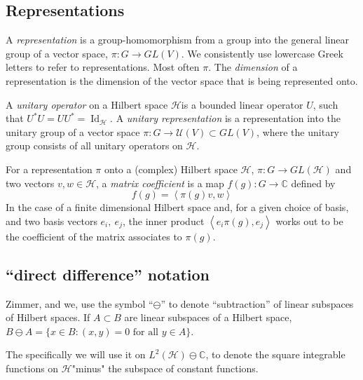 \documentclass[
  12pt
]{article}
\theoremstyle{break}
\theoremstyle{plain}
\newcommand{\bbc}{\ensuremath{\mathbb{C}}}
\newcommand{\hilb}{\ensuremath{\mathscr{H}}}
\newcommand{\inn}[1]{\left\langle #1 \right\rangle}
\DeclareMathOperator{\Id}{Id}
\begin{document}
  \hypertarget{representations}{%
  \subsection{Representations}\label{representations}}


  A \emph{representation} is a group-homomorphism from a group into the general linear
  group of a vector space, $\pi: G \rightarrow GL(V)$.
  We consistently use lowercase Greek letters to refer to representations.
  Most often $\pi$.
  The \emph{dimension} of a representation is the dimension of the vector space
  that is being represented onto.


  A \emph{unitary operator} on a Hilbert space \hilb is a bounded linear
  operator $U$, such that $U^*U= UU^* = \Id_{\hilb}$. A \emph{unitary
  representation} is a representation into the unitary group of a vector space
  $\pi: G \rightarrow \mathcal{U}(V) \subset GL(V)$, where the unitary group
  consists of all unitary operators on \hilb.

  For a representation $\pi$ onto a (complex) Hilbert space \hilb, $\pi:G \rightarrow GL(\hilb)$
  and two vectors $v, w \in \hilb$,
  a \emph{matrix coefficient} is a map $f(g): G \rightarrow \bbc$ defined by
  $$
  f(g) = \inn{\pi(g)v, w}
  $$
  In the case of a finite dimensional Hilbert space and, for a given choice of basis, and two basis vectors $e_i,\ e_j$,
  the inner product $\inn{e_i\pi(g), e_j}$ works out to be the coefficient of the matrix associates to $\pi(g)$.






  \hypertarget{direct-difference-notation}{%
  \subsection{``direct difference''
  notation}\label{direct-difference-notation}}

  Zimmer, and we, use the symbol ``$\ominus$'' to denote ``subtraction''
  of linear subspaces of Hilbert spaces. If $A \subset B$ are linear
  subspaces of a Hilbert space,
  $B \ominus A = \{x \in B: (x,y) = 0 \text{ for all }y \in A\}$.

  The specifically we will use it on $L^2(\hilb) \ominus \bbc$, to denote
  the square integrable functions on \hilb "minus" the subspace of constant functions.
\end{document}

